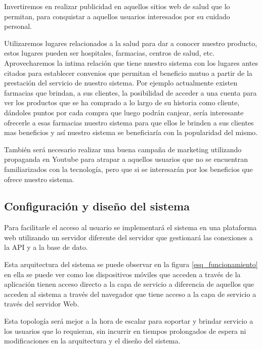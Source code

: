 \documentclass[a4paper,12pt]{article}
\begin{document}
Invertiremos en realizar publicidad en aquellos sitios web de salud que lo permitan, para conquistar a aquellos usuarios interesados por su cuidado personal.

Utilizaremos lugares relacionados a la salud para dar a conocer nuestro producto, estos lugares pueden ser hospitales, farmacias, centros de salud, etc. Aprovecharemos la intima relación que tiene nuestro sistema con los lugares antes citados para establecer  convenios que permitan el beneficio mutuo  a partir de la prestación del servicio de nuestro sistema. 
Por ejemplo actualmente existen farmacias que brindan, a sus clientes, la posibilidad  de acceder a una cuenta para ver  los productos que se ha comprado a lo largo de su historia como cliente, dándoles puntos por cada compra que luego podrán canjear, sería interesante ofrecerle a esas farmacias nuestro sistema para que ellos le brinden a sus clientes mas beneficios y así nuestro sistema se beneficiaría con la popularidad del mismo.

También será necesario realizar una buena campaña de marketing utilizando propaganda en Youtube para atrapar a aquellos usuarios que no se encuentran familiarizados con la tecnología, pero que si se interesarán por los beneficios que ofrece nuestro sistema.

\subsection{Configuración y diseño del sistema}
Para facilitarle el acceso al usuario se implementará el sistema en una plataforma web utilizando un servidor diferente del servidor que gestionará las conexiones a la  API y a la base de dato.

Esta arquitectura del sistema se puede observar en la figura \ref{esq_funcionamiento} en ella se puede ver como los dispositivos móviles que acceden a través de la aplicación tienen acceso directo a la capa de servicio a diferencia de aquellos que acceden al sistema a través del navegador que tiene acceso a la capa de servicio a través del servidor Web.

Esta topología será mejor a la hora de escalar para soportar y brindar servicio a los usuarios que lo requieran, sin incurrir en tiempos prolongados de espera ni modificaciones en la arquitectura y el diseño del sistema.
\end{document}
